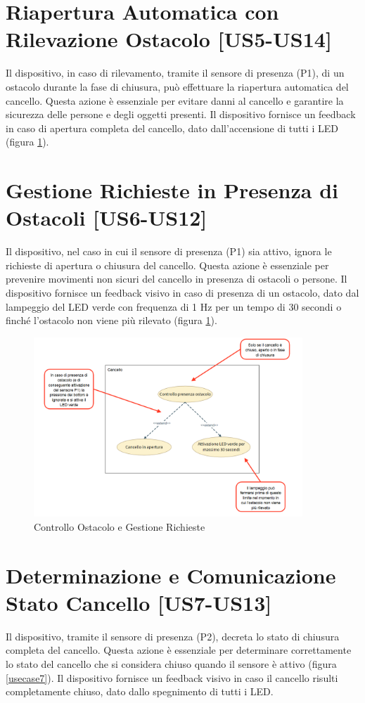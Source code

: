 \section{Riapertura Automatica con Rilevazione Ostacolo [US5-US14]}
Il dispositivo, in caso di rilevamento, tramite il sensore di presenza (P1), di un ostacolo durante la fase di chiusura, può effettuare la riapertura automatica del cancello.
Questa azione è essenziale per evitare danni al cancello e garantire la sicurezza delle persone e degli oggetti presenti. 
Il dispositivo fornisce un feedback in caso di apertura completa del cancello, dato dall'accensione di tutti i LED (figura \ref{usecase5}).


\section{Gestione Richieste in Presenza di Ostacoli [US6-US12]}
Il dispositivo, nel caso in cui il sensore di presenza (P1) sia attivo, ignora le richieste di apertura o chiusura del cancello.
Questa azione è essenziale per prevenire movimenti non sicuri del cancello in presenza di ostacoli o persone.
Il dispositivo fornisce un feedback visivo in caso di presenza di un ostacolo, dato dal lampeggio del LED verde con frequenza di 1 Hz per un tempo di 30 secondi o finché l'ostacolo non viene più rilevato (figura \ref{usecase5}).

\begin{figure}[H]
    \centering
    \includegraphics[width=0.9\textwidth]{figures/usecase_5.png}
    \caption{Controllo Ostacolo e Gestione Richieste}
    \label{usecase5}
\end{figure}


\section{Determinazione e Comunicazione Stato Cancello [US7-US13]}
Il dispositivo, tramite il sensore di presenza (P2), decreta lo stato di chiusura completa del cancello.
Questa azione è essenziale per determinare correttamente lo stato del cancello che si considera chiuso quando il sensore è attivo (figura \ref{usecase7}). 
Il dispositivo fornisce un feedback visivo in caso il cancello risulti completamente chiuso, dato dallo spegnimento di tutti i LED.

